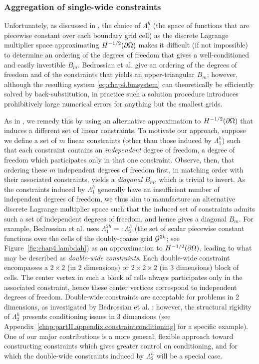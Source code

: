\subsubsection{Aggregation of single-wide constraints} \label{subsubsec:chap4.constraintaggregation}

Unfortunately, as discussed in \cite{Bedrossian10}, the choice of $\Lambda^h_1$ (the space of functions that are piecewise constant over each boundary grid cell) as the discrete Lagrange multiplier space approximating $H^{-1/2}(\partial\Omega)$ makes it difficult (if not impossible) to determine an ordering of the degrees of freedom that gives a well-conditioned and easily invertible $B_m$. Bedrossian et al. \cite{Bedrossian10} give an ordering of the degrees of freedom and of the constraints that yields an upper-triangular $B_m$; however, although the resulting system \eqref{eq:chap4.bmsystem} can theoretically be efficiently solved by back-substitution, in practice such a solution procedure introduces prohibitively large numerical errors for anything but the smallest grids.

As in \cite{Bedrossian10}, we remedy this by using an alternative approximation to $H^{-1/2}(\partial\Omega)$ that induces a different set of linear constraints. To motivate our approach, suppose we define a set of $m$ linear constraints (other than those induced by $\Lambda^h_1$) such that each constraint contains an \emph{independent} degree of freedom, a degree of freedom which participates only in that one constraint. Observe, then, that ordering these $m$ independent degrees of freedom first, in matching order with their associated constraints, yields a \emph{diagonal} $B_m$, which is trivial to invert. As the constraints induced by $\Lambda^h_1$ generally have an insufficient number of independent degrees of freedom, we thus aim to manufacture an alternative discrete Lagrange multiplier space such that the induced set of constraints admits such a set of independent degrees of freedom, and hence gives a diagonal $B_m$. For example, Bedrossian et al. \cite{Bedrossian10} uses $\Lambda^{2h}_1 =: \Lambda^h_2$ (the set of scalar piecewise constant functions over the cells of the doubly-coarse grid $\mathcal{G}^{2h}$; see Figure~\ref{fig:chap4.lambdah}) as an approximation to $H^{-1/2}(\partial\Omega)$, leading to what may be described as \emph{double-wide constraints}. Each double-wide constraint encompasses a $2 \times 2$ (in $2$ dimensions) or $2 \times 2 \times 2$ (in $3$ dimensions) block of cells. The center vertex in such a block of cells always participates only in the associated constraint, hence these center vertices correspond to independent degrees of freedom. Double-wide constraints are acceptable for problems in $2$ dimensions, as investigated by Bedrossian et al. \cite{Bedrossian10}; however, the structural rigidity of $\Lambda^h_2$ presents conditioning issues in $3$ dimensions (see Appendix~\ref{chap:partII.appendix.constraintconditioning} for a specific example). One of our major contributions is a more general, flexible approach toward constructing constraints which gives greater control on conditioning, and for which the double-wide constraints induced by $\Lambda^h_2$ will be a special case.

